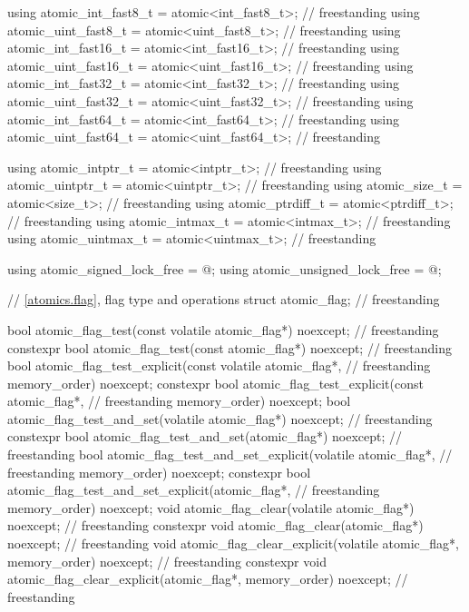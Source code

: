 \begin{codeblock}
{  using atomic_int_fast8_t    = atomic<int_fast8_t>;                                // freestanding
  using atomic_uint_fast8_t   = atomic<uint_fast8_t>;                               // freestanding
  using atomic_int_fast16_t   = atomic<int_fast16_t>;                               // freestanding
  using atomic_uint_fast16_t  = atomic<uint_fast16_t>;                              // freestanding
  using atomic_int_fast32_t   = atomic<int_fast32_t>;                               // freestanding
  using atomic_uint_fast32_t  = atomic<uint_fast32_t>;                              // freestanding
  using atomic_int_fast64_t   = atomic<int_fast64_t>;                               // freestanding
  using atomic_uint_fast64_t  = atomic<uint_fast64_t>;                              // freestanding

  using atomic_intptr_t       = atomic<intptr_t>;                                   // freestanding
  using atomic_uintptr_t      = atomic<uintptr_t>;                                  // freestanding
  using atomic_size_t         = atomic<size_t>;                                     // freestanding
  using atomic_ptrdiff_t      = atomic<ptrdiff_t>;                                  // freestanding
  using atomic_intmax_t       = atomic<intmax_t>;                                   // freestanding
  using atomic_uintmax_t      = atomic<uintmax_t>;                                  // freestanding

  using atomic_signed_lock_free   = @\seebelow@;
  using atomic_unsigned_lock_free = @\seebelow@;

  // \ref{atomics.flag}, flag type and operations
  struct atomic_flag;                                                               // freestanding

  bool atomic_flag_test(const volatile atomic_flag*) noexcept;                      // freestanding
  constexpr bool atomic_flag_test(const atomic_flag*) noexcept;                     // freestanding
  bool atomic_flag_test_explicit(const volatile atomic_flag*,                       // freestanding
                                 memory_order) noexcept;
  constexpr bool atomic_flag_test_explicit(const atomic_flag*,                      // freestanding
                                           memory_order) noexcept;
  bool atomic_flag_test_and_set(volatile atomic_flag*) noexcept;                    // freestanding
  constexpr bool atomic_flag_test_and_set(atomic_flag*) noexcept;                   // freestanding
  bool atomic_flag_test_and_set_explicit(volatile atomic_flag*,                     // freestanding
                                         memory_order) noexcept;
  constexpr bool atomic_flag_test_and_set_explicit(atomic_flag*,                    // freestanding
                                                   memory_order) noexcept;
  void atomic_flag_clear(volatile atomic_flag*) noexcept;                           // freestanding
  constexpr void atomic_flag_clear(atomic_flag*) noexcept;                          // freestanding
  void atomic_flag_clear_explicit(volatile atomic_flag*, memory_order) noexcept;    // freestanding
  constexpr void atomic_flag_clear_explicit(atomic_flag*, memory_order) noexcept;   // freestanding

}
\end{codeblock}
